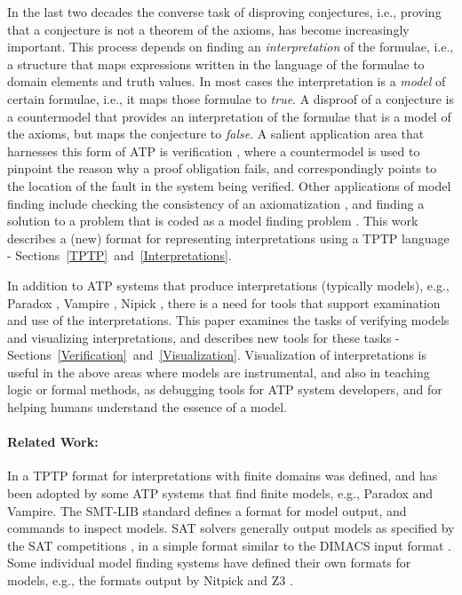 \documentclass[letterpaper]{article}
\begin{document}
In the last two decades the converse task of disproving conjectures, i.e., proving that a 
conjecture is not a theorem of the axioms, has become increasingly important.
This process depends on finding an {\em interpretation} of the formulae, i.e., a structure that
maps expressions written in the language of the formulae to domain elements and truth values.
In most cases the interpretation is a {\em model} of certain formulae, i.e., it maps those
formulae to {\em true}.
A disproof of a conjecture is a countermodel that provides an interpretation of the formulae 
that is a model of the axioms, but maps the conjecture to {\em false}.
A salient application area that harnesses this form of ATP is verification \cite{DKW08},
where a countermodel is used to pinpoint the reason why a proof obligation fails, and
correspondingly points to the location of the fault in the system being verified.
Other applications of model finding include checking the consistency of an axiomatization 
\cite{SS+17}, and finding a solution to a problem that is coded as a model finding problem 
\cite{Win82}.
This work describes a (new) format for representing interpretations using a TPTP language -
Sections~\ref{TPTP}~and~\ref{Interpretations}.

In addition to ATP systems that produce interpretations (typically models),
e.g., Paradox \cite{CS03}, Vampire \cite{KV13}, Nipick \cite{BN10-ITP},
there is a need for tools that support examination and use of the interpretations.
This paper examines the tasks of verifying models and visualizing interpretations, and describes 
new tools for these tasks - Sections~\ref{Verification}~and~\ref{Visualization}.
Visualization of interpretations is useful in the above areas where models are instrumental, 
and also in teaching logic or formal methods, as debugging tools for ATP system developers, 
and for helping humans understand the essence of a model.

\paragraph{Related Work:}
In \cite{SS+06} a TPTP format for interpretations with finite domains was defined, and has been 
adopted by some ATP systems that find finite models, e.g., Paradox and Vampire.
The SMT-LIB standard \cite{BFT17} defines a format for model output, and commands to inspect 
models.  
SAT solvers generally output models as specified by the SAT competitions \cite{JL+12}, in a 
simple format similar to the DIMACS input format \cite{Bab93}.
Some individual model finding systems have defined their own formats for models, e.g., the formats
output by Nitpick \cite{BN10-ITP} and Z3 \cite{dMB08}.
\end{document}
